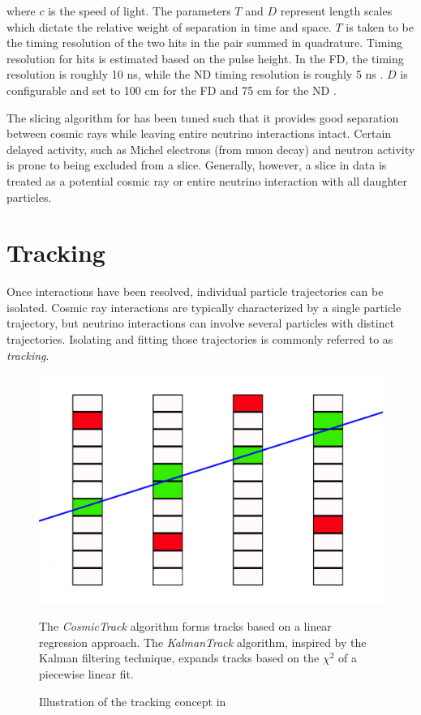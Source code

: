 where $c$ is the speed of light.  The parameters $T$ and $D$ represent
length scales which dictate the relative weight of separation in time and
space.
$T$ is taken to be the timing resolution  of the two hits
in the pair summed in quadrature.
Timing resolution for hits is estimated based on the pulse height.
In the FD,
the timing resolution is roughly 10 ns, while the ND timing resolution
is roughly 5 ns \cite{niner2015thesis}.
$D$ is configurable and set to 100 cm for the FD and 75 cm for the ND
\cite{baird2015thesis}.

The slicing algorithm for \nova has been tuned such that it provides good
separation between cosmic rays while leaving entire neutrino interactions
intact.  Certain delayed activity, such as Michel electrons (from muon decay)
and neutron activity is prone to being excluded from a slice.
Generally, however, a slice in \nova data is treated as a potential cosmic ray
or entire neutrino interaction with all daughter particles.


\section{Tracking}

Once interactions have been resolved, individual particle trajectories can be
isolated.
Cosmic ray interactions are typically characterized by a single particle
trajectory, but neutrino interactions can involve several particles with
distinct trajectories.
Isolating and fitting those trajectories is commonly referred to as
\textit{tracking}.

\begin{figure}[t]
\begin{center}
\includegraphics[width=\textwidth]{figures/figures/tracking.jpg}
\end{center}
\caption{Illustration of the tracking concept in \nova}{The \textit{CosmicTrack} algorithm forms tracks
 based on a linear regression approach.  The \textit{KalmanTrack} algorithm,
 inspired by the Kalman filtering technique, expands tracks based on the
 $\chi^2$ of a piecewise linear fit.}
\label{tracking}
\end{figure}


